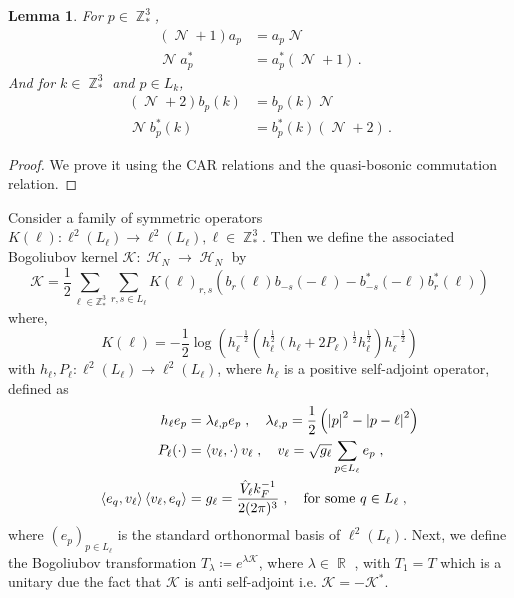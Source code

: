 \documentclass[sn-mathphys, Numbered ,a4paper]{sn-jnl}%
\DeclareMathOperator{\R}{\mathbb{R}}
\DeclareMathOperator{\Z}{\mathbb{Z}}
\DeclareMathOperator{\HH}{\mathcal{H}}
\DeclareMathOperator{\NN}{\mathcal{N}}
\newcommand{\half}{\frac{1}{2}}
\newcommand{\eva}[1]{\left\langle #1 \right\rangle}
\theoremstyle{plain}
\newtheorem{lemma}[theorem]{Lemma}
\theoremstyle{definition}
\theoremstyle{remark}
\theoremstyle{plain}
\theoremstyle{definition}
\theoremstyle{remark}
\begin{document}
\begin{lemma}\label{lem:commNab}
	For $p \in \Z^3_*$, 
	\begin{align}
		(\NN+1)a_p &= a_p\NN\\
		\NN a^*_p &= a^*_p (\NN+1)\,.
	\end{align}
	And for $k\in \Z^3_*$ and $p \in L_{k}$,
	\begin{align}
		(\NN+2)b_p(k) &= b_p(k)\NN\\
		\NN b^*_p(k) &= b^*_p(k) (\NN+2)\,.
	\end{align}
\end{lemma}
\begin{proof}
	We prove it using the CAR relations and the quasi-bosonic commutation relation.
\end{proof}
Consider a family of symmetric operators $K(\ell):\ell^2(L_\ell)\rightarrow \ell^2(L_\ell), \ell \in \Z^3_* $. Then we define the associated Bogoliubov kernel $\mathcal{K}:\HH_N\rightarrow\HH_N $ by
\begin{equation}
\mathcal{K} = \frac{1}{2}\sum\limits_{\ell\in \mathbb{Z}^3_*}\sum\limits_{r,s\in L_\ell}K(\ell)_{r,s}\left(b_r(\ell)b_{-s}(-\ell)-b^*_{-s}(-\ell)b^*_{r}(\ell)\right)
\end{equation}
where, 
\begin{equation}
	K(\ell) = -\half\log(h^{-\half}_{\ell}(h^{\half}_{\ell}(h_{\ell}+2P_\ell)^{\half}h^{\half}_{\ell})h^{-\half}_{\ell})
\end{equation}
with $h_{\ell}, P_{\ell}: \ell^2(L_{\ell})\rightarrow \ell^2(L_{\ell})$, where $h_{\ell}$ is a positive self-adjoint operator, defined as 
\begin{equation}\label{eq:hPdefs}
	\begin{aligned}
		h_\ell e_p &= \lambda_{\ell,p}e_p\; , \quad \lambda_{\ell,p} = \half\left(\abs{p}^2 - \abs{p-\ell}^2\right)\\
		P_{\ell}(\cdot) &= \eva{v_\ell,\cdot}v_\ell \;, \quad v_\ell = \sqrt{g_\ell}\sum_{p \in L_{\ell}}e_p\;,\\
		\eva{e_q,v_\ell}\eva{v_\ell,e_q}&=g_{\ell} = \frac{\hat{V}_{\ell}k_F^{-1}}{2(2\pi)^3}\;, \quad \text{for some } q \in L_\ell\;,
	\end{aligned}
\end{equation}
where $(e_p)_{p\in L_\ell}$ is the standard orthonormal basis of $\ell^2(L_{\ell})$. 
Next, we define the Bogoliubov transformation $ T_\lambda\coloneq e^{\lambda\mathcal{K}}$, where $\lambda \in \R$ , with $T_1=T$ which is a unitary due the fact that $\mathcal{K}$ is anti self-adjoint i.e. $\mathcal{K}=-\mathcal{K}^* $.\newline
\end{document}
